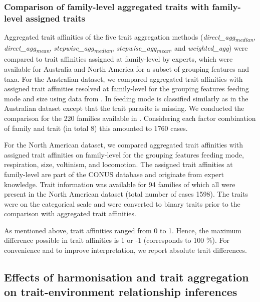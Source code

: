 \documentclass{article}
\begin{document}
\newpage

\subsubsection*{Comparison of family-level aggregated traits with family-level assigned traits}

Aggregated trait affinities of the five trait aggregation methods (\textit{direct\_agg\textsubscript{median}}, \textit{direct\_agg\textsubscript{mean}}, \textit{stepwise\_agg\textsubscript{median}}, \textit{stepwise\_agg\textsubscript{mean}}, and \textit{weighted\_agg}) were compared to trait affinities assigned at family-level by experts, which were available for Australia and North America for a subset of grouping features and taxa. For the Australian dataset, we compared aggregated trait affinities with assigned trait affinities resolved at family-level for the grouping features feeding mode and size using data from \citet{chessman_dissolved-oxygen_2018}. In \citet{chessman_dissolved-oxygen_2018} feeding mode is classified similarly as in the Australian dataset except that the trait parasite is missing. We conducted the comparison for the 220 families available in \citet{chessman_dissolved-oxygen_2018}. Considering each factor combination of family and trait (in total 8) this amounted to 1760 cases.

For the North American dataset, we compared aggregated trait affinities with assigned trait affinities on family-level for the grouping features feeding mode, respiration, size, voltinism, and locomotion. The assigned trait affinities at family-level are part of the CONUS database and originate from expert knowledge. Trait information was available for 94 families of which all were present in the North American dataset (total number of cases 1598). The traits were on the categorical scale and were converted to binary traits prior to the comparison with aggregated trait affinities.

As mentioned above, trait affinities ranged from 0 to 1. Hence, the maximum difference possible in trait affinities is 1 or -1 (corresponds to 100 \%). For convenience and to improve interpretation, we report absolute trait differences.



\subsection*{Effects of harmonisation and trait aggregation on trait-environment relationship inferences}
\end{document}
